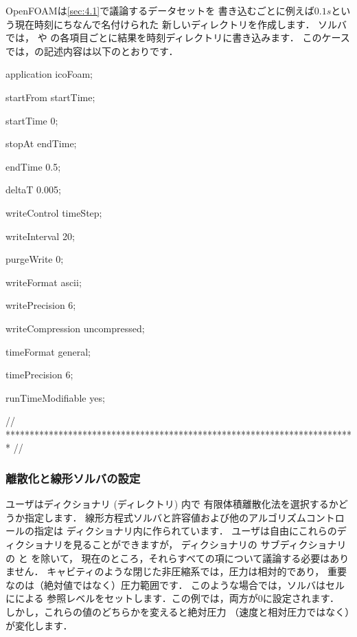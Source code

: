 OpenFOAMは\autoref{sec:4.1}で議論するデータセットを
書き込むごとに例えば$0.1\unit{s}$という現在時刻にちなんで名付けられた
新しいディレクトリを作成します．
%
%
ソルバでは，
%
%
や
%
%
の各項目ごとに結果を時刻ディレクトリに書き込みます．
このケースでは，の記述内容は以下のとおりです．
\begin{OFverbatim}[file, linenum=17]

application     icoFoam;

startFrom       startTime;

startTime       0;

stopAt          endTime;

endTime         0.5;

deltaT          0.005;

writeControl    timeStep;

writeInterval   20;

purgeWrite      0;

writeFormat     ascii;

writePrecision  6;

writeCompression uncompressed;

timeFormat      general;

timePrecision   6;

runTimeModifiable yes;


// ************************************************************************* //
\end{OFverbatim}

\subsubsection{離散化と線形ソルバの設定}
\label{sssec:2.1.1.5}
ユーザはディクショナリ (ディレクトリ) 内で
有限体積離散化法を選択するかどうか指定します．
線形方程式ソルバと許容値および他のアルゴリズムコントロールの指定は
ディクショナリ内に作られています．
ユーザは自由にこれらのディクショナリを見ることができますが，
ディクショナリの
%
%
サブディクショナリの
%
%
と
%
%
を除いて，
現在のところ，それらすべての項について議論する必要はありません．
キャビティのような閉じた非圧縮系では，圧力は相対的であり，
重要なのは（絶対値ではなく）圧力範囲です．
このような場合では，ソルバはセルにによる
参照レベルをセットします．この例では，両方が0に設定されます．
しかし，これらの値のどちらかを変えると絶対圧力
（速度と相対圧力ではなく）が変化します．


